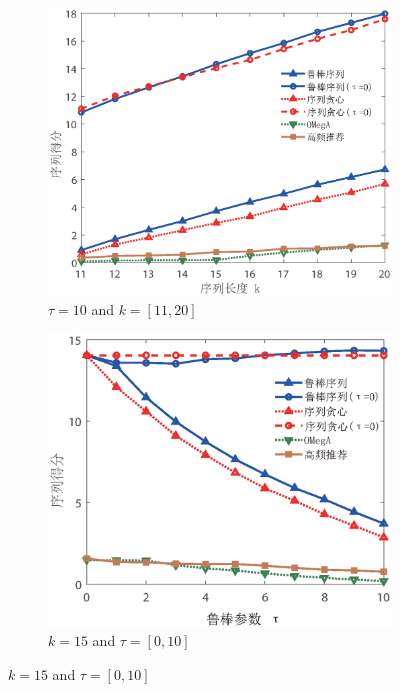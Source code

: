 \begin{figure}[H]
    \medskip

    \begin{subfigure}{0.45\textwidth}
       \includegraphics[width=\linewidth]{figure/rosenets/rec/rec-seq1}
        \caption{$\tau=10$ and $k=[11,20]$}
        \label{fig:rec-seq}
    \end{subfigure}
    \hfill
    \begin{subfigure}{0.45\textwidth}
        \includegraphics[width=\linewidth]{figure/rosenets/rec/rec-seq1-t}
        \caption{$k=15$ and $\tau=[0,10]$}
        \label{fig:rec-seq-t}
    \end{subfigure}


\end{figure}
